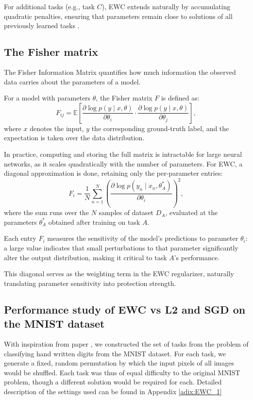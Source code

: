 \documentclass[11pt]{article}
\begin{document}
For additional tasks (e.g., task $C$), EWC extends naturally by accumulating quadratic penalties, ensuring that parameters remain close to solutions of all previously learned tasks \cite{Kirkpatrick_2017}. 



\subsection{The Fisher matrix}
The Fisher Information Matrix quantifies how much information the observed data carries about the parameters of a model. 

For a model with parameters $\theta$, the Fisher matrix $F$ is 
defined as:
\begin{equation}
    F_{ij} = \mathbb{E}\left[ \frac{\partial \log p(y \mid x, \theta)}{\partial 
    \theta_i} \cdot \frac{\partial \log p(y \mid x, \theta)}{\partial \theta_j} 
    \right],
    \label{fisher_first_expression}
\end{equation}
where $x$ denotes the input, $y$ the corresponding ground-truth label, and the expectation is taken over the data distribution. 

In practice, computing and storing the full matrix is intractable for large neural networks, as it scales 
quadratically with the number of parameters. For EWC, a diagonal approximation is done, retaining only the per-parameter entries:
\begin{equation}
    F_i = \frac{1}{N} \sum_{n=1}^{N} \left( \frac{\partial \log p(y_n \mid x_n, 
    \theta_A^*)}{\partial \theta_i} \right)^2,
\end{equation}
where the sum runs over the $N$ samples of dataset $D_A$, evaluated at the parameters $\theta_A^*$ obtained after training on task $A$. 

Each entry $F_i$ measures the sensitivity of the model's predictions to parameter $\theta_i$: a 
large value indicates that small perturbations to that parameter significantly alter the output distribution, making it critical to task $A$'s performance. \cite{pascanu2013revisiting}

This diagonal serves as the weighting term in the EWC regularizer, naturally translating parameter sensitivity into protection strength.

\subsection{Performance study of EWC vs L2 and SGD on the MNIST dataset}
With inspiration from paper \cite{Kirkpatrick_2017}, we constructed the set of tasks from the problem of classifying hand written digits from the MNIST
\cite{LeCun1998} dataset. For each task, we generate a fixed, random
permutation by which the input pixels of all images would be shuffled. Each task was thus of equal difficulty to the original MNIST problem, though a different solution would be required for each.
Detailed description of the settings used can be found in Appendix \ref{adix:EWC_1}
\\\\
\end{document}
